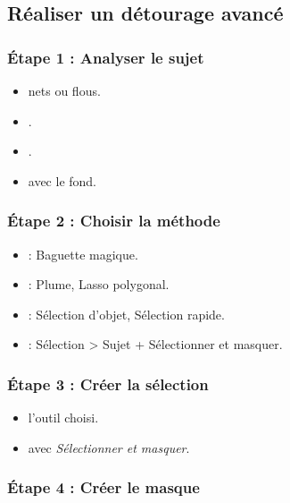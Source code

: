 \subsection{Réaliser un détourage avancé}

\subsubsection{Étape 1 : Analyser le sujet}

\begin{itemize}
    \item {} nets ou flous.
    \item {}.
    \item {}.
    \item {} avec le fond.
\end{itemize}

\subsubsection{Étape 2 : Choisir la méthode}

\begin{itemize}
    \item {} : Baguette magique.
    \item {} : Plume, Lasso polygonal.
    \item {} : Sélection d'objet, Sélection rapide.
    \item {} : Sélection > Sujet + Sélectionner et masquer.
\end{itemize}

\subsubsection{Étape 3 : Créer la sélection}

\begin{itemize}
    \item {} l'outil choisi.
    \item {} avec \emph{Sélectionner et masquer}.
\end{itemize}

\subsubsection{Étape 4 : Créer le masque}

